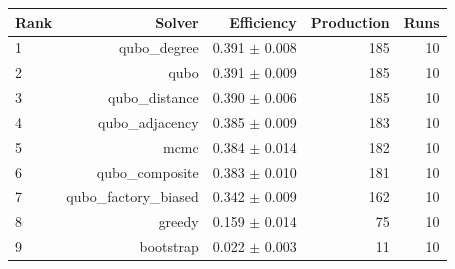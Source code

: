 \begin{tabular}{lrrrr}
\toprule
Rank & Solver & Efficiency & Production & Runs \\
\midrule
1 & qubo\_degree & 0.391 $\pm$ 0.008 & 185 & 10 \\
2 & qubo & 0.391 $\pm$ 0.009 & 185 & 10 \\
3 & qubo\_distance & 0.390 $\pm$ 0.006 & 185 & 10 \\
4 & qubo\_adjacency & 0.385 $\pm$ 0.009 & 183 & 10 \\
5 & mcmc & 0.384 $\pm$ 0.014 & 182 & 10 \\
6 & qubo\_composite & 0.383 $\pm$ 0.010 & 181 & 10 \\
7 & qubo\_factory\_biased & 0.342 $\pm$ 0.009 & 162 & 10 \\
8 & greedy & 0.159 $\pm$ 0.014 & 75 & 10 \\
9 & bootstrap & 0.022 $\pm$ 0.003 & 11 & 10 \\
\bottomrule
\end{tabular}
